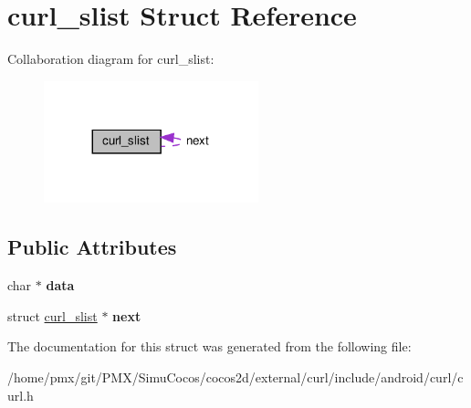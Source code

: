 \hypertarget{structcurl__slist}{}\section{curl\+\_\+slist Struct Reference}
\label{structcurl__slist}


Collaboration diagram for curl\+\_\+slist\+:
\nopagebreak
\begin{figure}[H]
\begin{center}
\leavevmode
\includegraphics[width=176pt]{structcurl__slist__coll__graph}
\end{center}
\end{figure}
\subsection*{Public Attributes}
\begin{DoxyCompactItemize}
\item 
\mbox{\label{structcurl__slist_ae17502e793e0ce5ab980d23ec03e3b3d}} 
char $\ast$ {\bfseries data}
\item 
\mbox{\label{structcurl__slist_a6e1dfa388f4672c3853c3a3d8c57a69b}} 
struct \hyperlink{structcurl__slist}{curl\+\_\+slist} $\ast$ {\bfseries next}
\end{DoxyCompactItemize}


The documentation for this struct was generated from the following file\+:\begin{DoxyCompactItemize}
\item 
/home/pmx/git/\+P\+M\+X/\+Simu\+Cocos/cocos2d/external/curl/include/android/curl/curl.\+h\end{DoxyCompactItemize}
